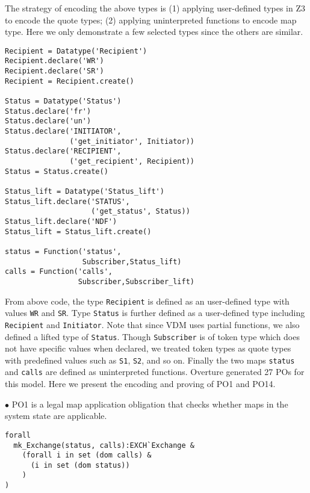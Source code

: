 The strategy of encoding the above types is (1) applying user-defined types in Z3 to encode the quote types; (2) applying uninterpreted functions to encode map type. Here we only demonstrate a few selected types since the others are similar. 

\begin{mdframed}[roundcorner=5pt,shadow=true]
\begin{Verbatim}[fontsize=\small]
Recipient = Datatype('Recipient')
Recipient.declare('WR')
Recipient.declare('SR')
Recipient = Recipient.create()

Status = Datatype('Status')
Status.declare('fr')
Status.declare('un')
Status.declare('INITIATOR',
               ('get_initiator', Initiator))
Status.declare('RECIPIENT',
               ('get_recipient', Recipient))
Status = Status.create()

Status_lift = Datatype('Status_lift')
Status_lift.declare('STATUS',
                    ('get_status', Status))
Status_lift.declare('NDF')
Status_lift = Status_lift.create()

status = Function('status',
                  Subscriber,Status_lift)
calls = Function('calls',
                 Subscriber,Subscriber_lift)
\end{Verbatim}
\end{mdframed}

From above code, the type {\tt Recipient} is defined as an user-defined type with values {\tt WR} and {\tt SR}. Type {\tt Status} is further defined as a user-defined type including {\tt Recipient} and {\tt Initiator}. Note that since VDM uses partial functions, we also defined a lifted type of {\tt Status}. Though {\tt Subscriber} is of token type which does not have specific values when declared, we treated token types as quote types with predefined values such as {\tt S1}, {\tt S2}, and so on. Finally the two maps {\tt status} and {\tt calls} are defined as uninterpreted functions. Overture generated 27 POs for this model. Here we present the encoding and proving of PO1 and PO14.

$\bullet$ PO1 is a legal map application obligation that checks whether maps in the system state are applicable. 

\begin{mdframed}[roundcorner=5pt]
\begin{Verbatim}[fontsize=\small]
forall
  mk_Exchange(status, calls):EXCH`Exchange &
    (forall i in set (dom calls) &
      (i in set (dom status))
    )
)
\end{Verbatim}
\end{mdframed}

